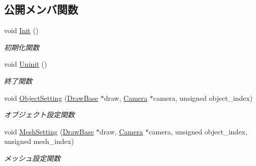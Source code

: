 \subsection*{公開メンバ関数}
\begin{DoxyCompactItemize}
\item 
void \mbox{\hyperlink{class_vertex_shader_fixed_ae829ff736b33c45543804059255125b6}{Init}} ()
\begin{DoxyCompactList}\small\item\em 初期化関数 \end{DoxyCompactList}\item 
void \mbox{\hyperlink{class_vertex_shader_fixed_a49f630aee4757c8fd8bae886f22dfeb0}{Uninit}} ()
\begin{DoxyCompactList}\small\item\em 終了関数 \end{DoxyCompactList}\item 
void \mbox{\hyperlink{class_vertex_shader_fixed_abe7cdb76b7da899680b1079344631cef}{Object\+Setting}} (\mbox{\hyperlink{class_draw_base}{Draw\+Base}} $\ast$draw, \mbox{\hyperlink{class_camera}{Camera}} $\ast$camera, unsigned object\+\_\+index)
\begin{DoxyCompactList}\small\item\em オブジェクト設定関数 \end{DoxyCompactList}\item 
void \mbox{\hyperlink{class_vertex_shader_fixed_ab6e2024e01390866d778aa6db4085ac4}{Mesh\+Setting}} (\mbox{\hyperlink{class_draw_base}{Draw\+Base}} $\ast$draw, \mbox{\hyperlink{class_camera}{Camera}} $\ast$camera, unsigned object\+\_\+index, unsigned mesh\+\_\+index)
\begin{DoxyCompactList}\small\item\em メッシュ設定関数 \end{DoxyCompactList}\end{DoxyCompactItemize}

